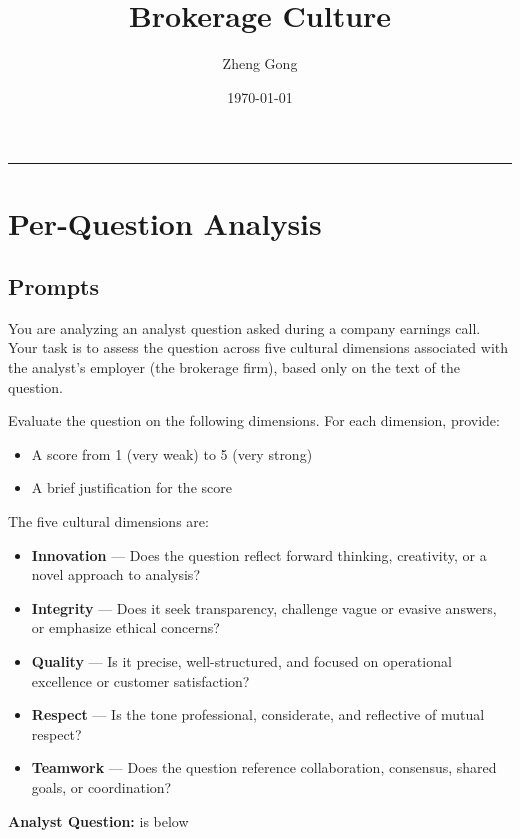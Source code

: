 \documentclass[10pt]{article}
\title{Brokerage Culture}
\author{Zheng Gong}
\date{\today}
\begin{document}
\maketitle
\thispagestyle{empty}
\begin{center}
    \rule{0.8\textwidth}{0.4pt}
\end{center}
\vspace{1em}


\section{Per-Question Analysis}

\subsection{Prompts}
You are analyzing an analyst question asked during a company earnings call. Your task is to assess the question across five cultural dimensions associated with the analyst’s employer (the brokerage firm), based only on the text of the question.

Evaluate the question on the following dimensions. For each dimension, provide:
\begin{itemize}
\item A score from 1 (very weak) to 5 (very strong)
\item A brief justification for the score
\end{itemize}

The five cultural dimensions are:

\begin{itemize}
\item \textbf{Innovation} — Does the question reflect forward thinking, creativity, or a novel approach to analysis?
\item \textbf{Integrity} — Does it seek transparency, challenge vague or evasive answers, or emphasize ethical concerns?
\item \textbf{Quality} — Is it precise, well-structured, and focused on operational excellence or customer satisfaction?
\item \textbf{Respect} — Is the tone professional, considerate, and reflective of mutual respect?
\item \textbf{Teamwork} — Does the question reference collaboration, consensus, shared goals, or coordination?
\end{itemize}

\textbf{Analyst Question:} is below
\end{document}
